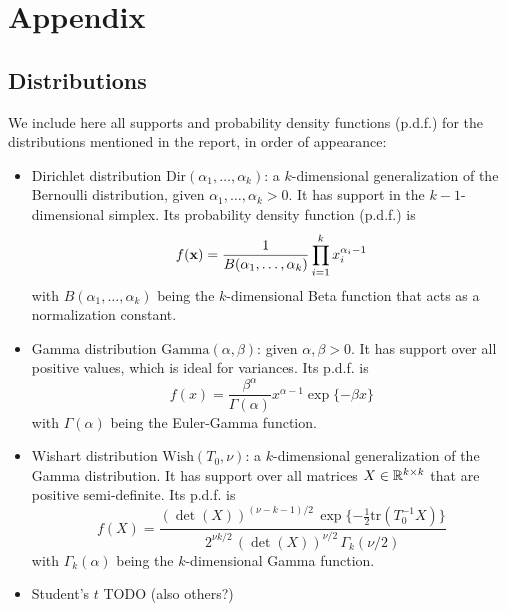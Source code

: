 \part{Appendix}
\chapter{Distributions}
We include here all supports and probability density functions (p.d.f.) for the distributions mentioned in the report, in order of appearance:
\begin{itemize}
	\item Dirichlet distribution $\text{Dir}(\alpha_1, \dots, \alpha_k)$: a $k$-dimensional generalization of the Bernoulli distribution, given $\alpha_1,\dots,\alpha_k > 0$.
	It has support in the $k-1$-dimensional simplex.
	Its probability density function (p.d.f.) is
	$$f(\textbf x) = \frac{1}{B(\alpha_1, \dots, \alpha_k)} \prod_{i=1}^k x_i^{\alpha_i-1}$$
	with $B(\alpha_1, \dots, \alpha_k)$ being the $k$-dimensional Beta function that acts as a normalization constant.
	\item Gamma distribution $\text{Gamma}(\alpha,\beta)$: given $\alpha,\beta > 0$.
	It has support over all positive values, which is ideal for variances.
	Its p.d.f. is
	$$f(x) = \frac{\beta^\alpha}{\Gamma(\alpha)} x^{\alpha-1} \exp\{-\beta x\}$$
	with $\Gamma(\alpha)$ being the Euler-Gamma function.
	\item Wishart distribution $\text{Wish}(T_0, \nu)$: a $k$-dimensional generalization of the Gamma distribution.
	It has support over all matrices $X \in \mathbb R^{k \times k}$ that are positive semi-definite.
	Its p.d.f. is
	$$f(X) = \frac{ (\det(X))^{(\nu-k-1)/2} \, \exp\{-\frac{1}{2} \text{tr}(T_0^{-1} X)\} }{ 2^{\nu k/2} \, (\det(X))^{\nu/2} \, \Gamma_k(\nu/2) } $$
	with $\Gamma_k(\alpha)$ being the $k$-dimensional Gamma function.
	\item Student's $t$ TODO (also others?)
\end{itemize}
